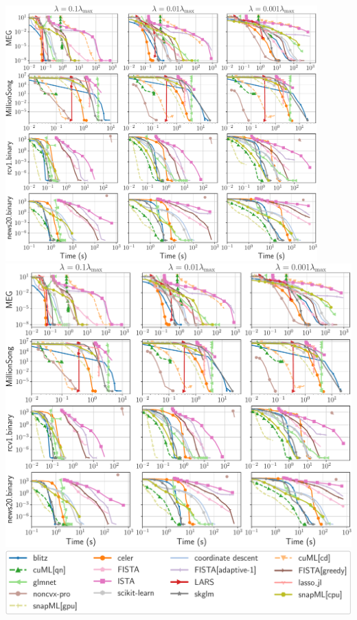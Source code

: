 \documentclass[landscape,a0paper,fontscale=0.265]{baposter}
\begin{document}
\begin{poster}
{%
\centering
\includegraphics[width=0.9\textwidth,trim={0 48em 0 0},clip]{meg_rcv1_news20_MSD.pdf}\\
\includegraphics[width=\textwidth,trim={0 0 0 62em},clip]{meg_rcv1_news20_MSD.pdf}\\[.5em]
\includegraphics[width=.9\textwidth]{meg_rcv1_news20_MSD_legend}\\


}



\end{poster}
\end{document}
